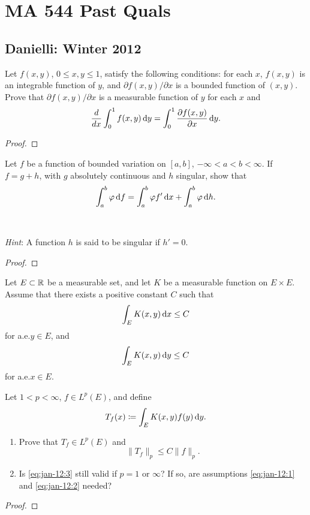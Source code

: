 \section{MA 544 Past Quals}
\subsection{Danielli: Winter 2012}
\begin{problem}
Let $f(x,y)$, $0\leq x,y\leq 1$, satisfy the following conditions: for each
$x$, $f(x,y)$ is an integrable function of $y$, and $\partial
f(x,y)/\partial x$ is a bounded function of $(x,y)$. Prove that $\partial
f(x,y)/\partial x$ is a measurable function of $y$ for each $x$ and
\[
\frac{d}{dx}\int_0^1f(x,y)\mathop{}\!\mathrm{d} y=
\int_0^1\frac{\partial f(x,y)}{\partial x}\mathop{}\!\mathrm{d} y.
\]
\end{problem}
\begin{proof}
\end{proof}

\begin{problem}
Let $f$ be a function of bounded variation on $[a,b]$,
$-\infty<a<b<\infty$. If $f=g+h$, with $g$ absolutely continuous and $h$
singular, show that
\[
\int_a^b\varphi\mathop{}\!\mathrm{d} f=\int_a^b\varphi f'\mathop{}\!\mathrm{d} x+\int_a^b\varphi\mathop{}\!\mathrm{d} h.
\]
\\\\
\emph{Hint}: A function $h$ is said to be singular if $h'=0$.
\end{problem}
\begin{proof}
\end{proof}

\begin{problem}
Let $E\subset\mathbb{R}$ be a measurable set, and let $K$ be a measurable
function on $E\times E$. Assume that there exists a positive constant $C$
such that
\begin{equation}
\label{eq:jan-12:1}
\int_E K(x,y)\mathop{}\!\mathrm{d} x\leq C
\end{equation}
for a.e.\@ $y\in E$, and
\begin{equation}
\label{eq:jan-12:2}
\int_E K(x,y)\mathop{}\!\mathrm{d} y\leq C
\end{equation}
for a.e.\@ $x\in E$.

Let $1<p<\infty$, $f\in L^p(E)$, and define
\[
T_f(x)\coloneq\int_E K(x,y)f(y)\mathop{}\!\mathrm{d} y.
\]
\begin{enumerate}[label=(\alph*),noitemsep]
\item Prove that $T_f\in L^p(E)$ and
\begin{equation}
\label{eq:jan-12:3}
\|T_f\|_p\leq C\|f\|_p.
\end{equation}
\item Is \eqref{eq:jan-12:3} still valid if $p=1$ or $\infty$? If so, are
  assumptions \eqref{eq:jan-12:1} and \eqref{eq:jan-12:2} needed?
\end{enumerate}
\end{problem}
\begin{proof}
\end{proof}

